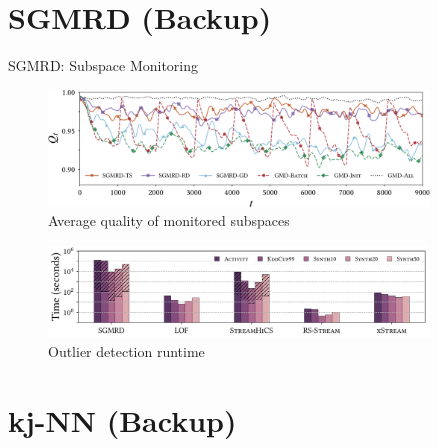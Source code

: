 \documentclass[16pt,usenames,dvipsnames, notheorems]{beamer}
\theoremstyle{definition}
\theoremstyle{example}
\theoremstyle{plain}
\begin{document}
\section{SGMRD (Backup)}

\begin{frame}{SGMRD: Subspace Monitoring}

\begin{figure}
	\includegraphics[width=0.9\textwidth]{figures/bioliq_avgcontrast_step2-crop-compressed.pdf}
	\caption*{Average quality of monitored subspaces}
\end{figure}
\vspace{-0.5cm}
\begin{figure}
	\includegraphics[width=0.9\textwidth]{figures/runtime-2-2-compressed.pdf}
	\caption*{Outlier detection runtime}
\end{figure}

\end{frame}

\section{kj-NN (Backup)}
\end{document}
